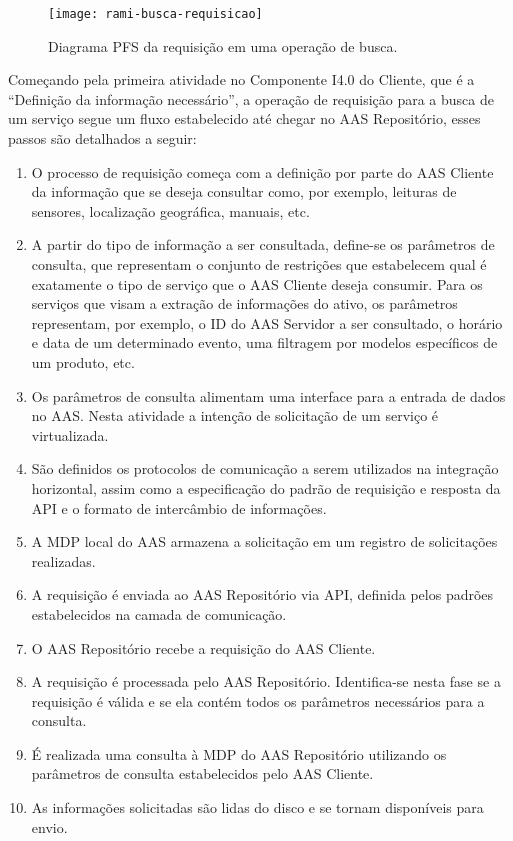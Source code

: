 	\begin{figure}[htb]
		\centering
		\caption{Diagrama PFS da requisição em uma operação de busca.}
		\label{fig:rami-busca-requisicao}
		\texttt{[image: rami-busca-requisicao]}
	\end{figure}

	Começando pela primeira atividade no Componente I4.0 do Cliente, que é a ``Definição da informação necessário'', a operação de requisição para a busca de um serviço segue um fluxo estabelecido até chegar no AAS Repositório, esses passos são detalhados a seguir:
	
	\begin{enumerate}
		\item O processo de requisição começa com a definição por parte do AAS Cliente da informação que se deseja consultar como, por exemplo, leituras de sensores, localização geográfica, manuais, etc.
		
		\item A partir do tipo de informação a ser consultada, define-se os parâmetros de consulta, que representam o conjunto de restrições que estabelecem qual é exatamente o tipo de serviço que o AAS Cliente deseja consumir. Para os serviços que visam a extração de informações do ativo, os parâmetros representam, por exemplo, o ID do AAS Servidor a ser consultado, o horário e data de um determinado evento, uma filtragem por modelos específicos de um produto, etc.
		
		\item Os parâmetros de consulta alimentam uma interface para a entrada de dados no AAS. Nesta atividade a intenção de solicitação de um serviço é virtualizada.
		
		\item São definidos os protocolos de comunicação a serem utilizados na integração horizontal, assim como a especificação do padrão de requisição e resposta da API e o formato de intercâmbio de informações.
		
		\item A MDP local do AAS armazena a solicitação em um registro de solicitações realizadas.
		
		\item A requisição é enviada ao AAS Repositório via API, definida pelos padrões estabelecidos na camada de comunicação.
		
		\item O AAS Repositório recebe a requisição do AAS Cliente.
		
		\item A requisição é processada pelo AAS Repositório. Identifica-se nesta fase se a requisição é válida e se ela contém todos os parâmetros necessários para a consulta.
		
		\item É realizada uma consulta à MDP do AAS Repositório utilizando os parâmetros de consulta estabelecidos pelo AAS Cliente.
		
		\item As informações solicitadas são lidas do disco e se tornam disponíveis para envio.
	\end{enumerate}

